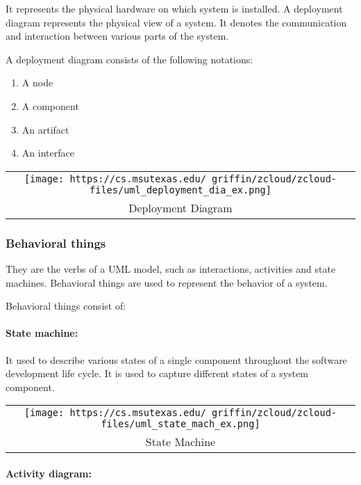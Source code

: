 \documentclass[
]{article}
\providecommand{\tightlist}{%
  \setlength{\itemsep}{0pt}\setlength{\parskip}{0pt}}
\begin{document}
It represents the physical hardware on which system is installed. A
deployment diagram represents the physical view of a system. It denotes
the communication and interaction between various parts of the system.

A deployment diagram consists of the following notations:

\begin{enumerate}
\def\labelenumi{\arabic{enumi}.}
\tightlist
\item
  A node
\item
  A component
\item
  An artifact
\item
  An interface
\end{enumerate}

\begin{longtable}[]{@{}c@{}}
\toprule
\endhead
\texttt{[image: https://cs.msutexas.edu/~griffin/zcloud/zcloud-files/uml\_deployment\_dia\_ex.png]}\tabularnewline
Deployment Diagram\tabularnewline
\bottomrule
\end{longtable}

\hypertarget{behavioral-things}{%
\subsubsection{Behavioral things}\label{behavioral-things}}

They are the verbs of a UML model, such as interactions, activities and
state machines. Behavioral things are used to represent the behavior of
a system.

Behavioral things consist of:

\hypertarget{state-machine}{%
\paragraph{State machine:}\label{state-machine}}

It used to describe various states of a single component throughout the
software development life cycle. It is used to capture different states
of a system component.

\begin{longtable}[]{@{}c@{}}
\toprule
\endhead
\texttt{[image: https://cs.msutexas.edu/~griffin/zcloud/zcloud-files/uml\_state\_mach\_ex.png]}\tabularnewline
State Machine\tabularnewline
\bottomrule
\end{longtable}

\hypertarget{activity-diagram}{%
\paragraph{Activity diagram:}\label{activity-diagram}}
\end{document}
